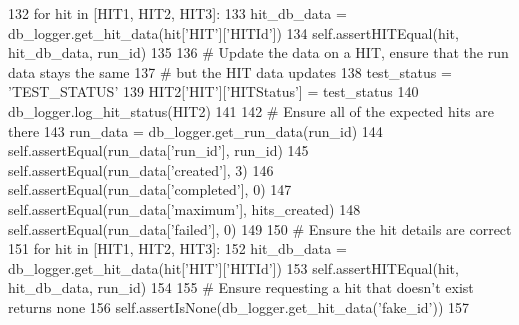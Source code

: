 \begin{DoxyCode}
132         \textcolor{keywordflow}{for} hit \textcolor{keywordflow}{in} [HIT1, HIT2, HIT3]:
133             hit\_db\_data = db\_logger.get\_hit\_data(hit[\textcolor{stringliteral}{'HIT'}][\textcolor{stringliteral}{'HITId'}])
134             self.assertHITEqual(hit, hit\_db\_data, run\_id)
135 
136         \textcolor{comment}{# Update the data on a HIT, ensure that the run data stays the same}
137         \textcolor{comment}{# but the HIT data updates}
138         test\_status = \textcolor{stringliteral}{'TEST\_STATUS'}
139         HIT2[\textcolor{stringliteral}{'HIT'}][\textcolor{stringliteral}{'HITStatus'}] = test\_status
140         db\_logger.log\_hit\_status(HIT2)
141 
142         \textcolor{comment}{# Ensure all of the expected hits are there}
143         run\_data = db\_logger.get\_run\_data(run\_id)
144         self.assertEqual(run\_data[\textcolor{stringliteral}{'run\_id'}], run\_id)
145         self.assertEqual(run\_data[\textcolor{stringliteral}{'created'}], 3)
146         self.assertEqual(run\_data[\textcolor{stringliteral}{'completed'}], 0)
147         self.assertEqual(run\_data[\textcolor{stringliteral}{'maximum'}], hits\_created)
148         self.assertEqual(run\_data[\textcolor{stringliteral}{'failed'}], 0)
149 
150         \textcolor{comment}{# Ensure the hit details are correct}
151         \textcolor{keywordflow}{for} hit \textcolor{keywordflow}{in} [HIT1, HIT2, HIT3]:
152             hit\_db\_data = db\_logger.get\_hit\_data(hit[\textcolor{stringliteral}{'HIT'}][\textcolor{stringliteral}{'HITId'}])
153             self.assertHITEqual(hit, hit\_db\_data, run\_id)
154 
155         \textcolor{comment}{# Ensure requesting a hit that doesn't exist returns none}
156         self.assertIsNone(db\_logger.get\_hit\_data(\textcolor{stringliteral}{'fake\_id'}))
157 
\end{DoxyCode}
\mbox{\label{classparlai_1_1mturk_1_1core_1_1legacy__2018_1_1test_1_1test__db__interactions_1_1TestDataHandler_a0292af13ed4697ccbfad99f645993419}} 
